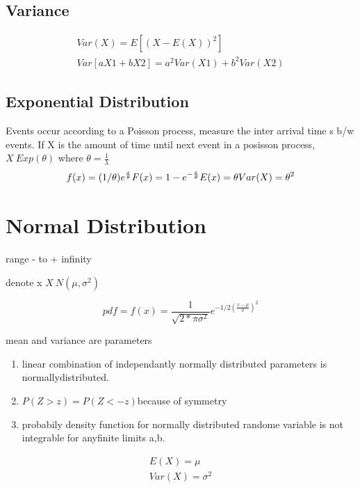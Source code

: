 \documentclass[11pt]{amsart}
\begin{document}
\subsection{Variance}
\begin{equation}
  \begin{aligned}
    Var(X) = E[(X-E(X))^2]\\
    Var [aX1+bX2] = a^2Var(X1)  + b^2Var(X2)
  \end{aligned}
\end{equation}
\subsection{Exponential Distribution}
\par Events occur according to a Poisson process, measure the inter arrival
time s b/w events. If X is the amount of  time until next event in a posisson
process, $X~Exp(\theta)$ where $\theta = \frac{1}{\lambda}$
\begin{equation}
  \begin{aligned}
    f(x) = (1/\theta) e^{\-\frac{x}{\theta}}
    F(x) = 1 - e^{-\frac{x}{\theta}}
    E(x) = \theta
    Var(X) = \theta^2
  \end{aligned}
\end{equation}
\section{Normal Distribution}
\begin{enum}
\item range - to + infinity
\item denote x $X~N(\mu, \sigma^2)$
\end{enum}

\begin{equation}
  pdf = f(x) = \frac{1}{\sqrt{2*\pi\sigma^2}}e^{-1/2(\frac{x-\mu}{\sigma})^2}
\end{equation}
  \par mean and variance are parameters
  \begin{enumerate}
    \item linear combination of independantly normally distributed parameters
      is normallydistributed.
    \item $P(Z>z) = P(Z<-z) $because of symmetry
    \item probabily density function for normally distributed randome variable
      is not integrable for anyfinite limits a,b.

  \end{enumerate}
  \begin{equation}
    \begin{aligned}
      E(X) = \mu\\
      Var(X) = \sigma^2
    \end{aligned}
  \end{equation}
\end{document}
